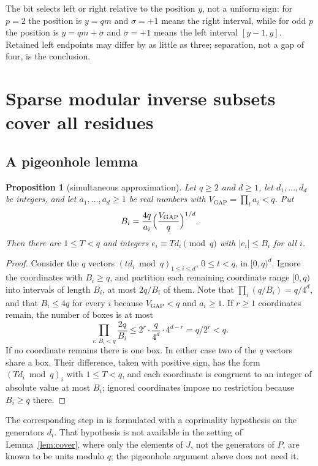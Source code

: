 \documentclass[11pt,letterpaper]{article}
\numberwithin{equation}{section}
\theoremstyle{plain}
\newtheorem{proposition}{Proposition}
\theoremstyle{remark}
\newcommand{\Vgap}{V_{\mathrm{GAP}}}
\begin{document}
The bit selects left or right relative to the position $y$, not a uniform sign: for $p=2$ the position is $y=qm$ and $\sigma=+1$ means the right interval, while for odd $p$ the position is $y=qm+\sigma$ and $\sigma=+1$ means the left interval $[y-1,y]$. Retained left endpoints may differ by as little as three; separation, not a gap of four, is the conclusion.

\section{Sparse modular inverse subsets cover all residues}\label{sec:cover}

\subsection{A pigeonhole lemma}\label{sec:pigeon}

\begin{proposition}[simultaneous approximation]\label{prop:pigeon}
Let $q\ge2$ and $d\ge1$, let $d_1,\ldots,d_d$ be integers, and let $a_1,\ldots,a_d\ge1$ be real numbers with $\Vgap=\prod_ia_i<q$. Put
\[
B_i=\frac{4q}{a_i}\Bigl(\frac{\Vgap}q\Bigr)^{1/d}.
\]
Then there are $1\le T<q$ and integers $e_i\equiv Td_i\pmod q$ with $|e_i|\le B_i$ for all $i$.
\end{proposition}

\begin{proof}
Consider the $q$ vectors $(td_i\bmod q)_{1\le i\le d}$, $0\le t<q$, in $[0,q)^d$. Ignore the coordinates with $B_i\ge q$, and partition each remaining coordinate range $[0,q)$ into intervals of length $B_i$, at most $2q/B_i$ of them. Note that $\prod_i(q/B_i)=q/4^d$, and that $B_i\le4q$ for every $i$ because $\Vgap<q$ and $a_i\ge1$. If $r\ge1$ coordinates remain, the number of boxes is at most
\[
\prod_{i:\,B_i<q}\frac{2q}{B_i}\le2^r\cdot\frac{q}{4^d}\cdot4^{d-r}=q/2^r<q .
\]
If no coordinate remains there is one box. In either case two of the $q$ vectors share a box. Their difference, taken with positive sign, has the form $(Td_i\bmod q)_i$ with $1\le T<q$, and each coordinate is congruent to an integer of absolute value at most $B_i$; ignored coordinates impose no restriction because $B_i\ge q$ there.
\end{proof}

The corresponding step in \cite{CFHMPSV} is formulated with a coprimality hypothesis on the generators $d_i$. That hypothesis is not available in the setting of Lemma~\ref{lem:cover}, where only the elements of $J$, not the generators of $P$, are known to be units modulo $q$; the pigeonhole argument above does not need it.
\end{document}
